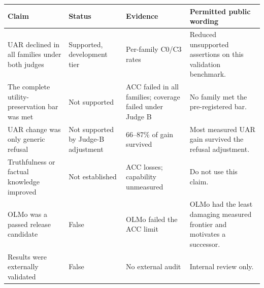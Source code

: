 \begin{center}
\label{tab:claims}
\scriptsize
\begin{tabularx}{\textwidth}{@{}p{}p{}p{}X@{}}
\toprule
\textbf{Claim} & \textbf{Status} & \textbf{Evidence} & \textbf{Permitted public wording} \\
\midrule
UAR declined in all families under both judges & Supported, development tier & Per-family C0/C3 rates & Reduced unsupported assertions on this validation benchmark. \\
The complete utility-preservation bar was met & Not supported & ACC failed in all families; coverage failed under Judge B & No family met the pre-registered bar. \\
UAR change was only generic refusal & Not supported by Judge-B adjustment & 66--87\% of gain survived & Most measured UAR gain survived the refusal adjustment. \\
Truthfulness or factual knowledge improved & Not established & ACC losses; capability unmeasured & Do not use this claim. \\
OLMo was a passed release candidate & False & OLMo failed the ACC limit & OLMo had the least damaging measured frontier and motivates a successor. \\
Results were externally validated & False & No external audit & Internal review only. \\
\bottomrule
\end{tabularx}
\end{center}
